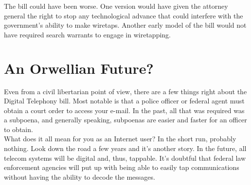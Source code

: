 The bill could have been worse. One version would have given the
attorney general the right to stop any technological advance that could
interfere with the government's ability to make wiretaps. Another early
model of the bill would not have required search warrants to engage in
wiretapping.\\

\section{An Orwellian Future?}
Even from a civil libertarian point of view, there are a few things
right about the Digital Telephony bill. Most notable is that a police
officer or federal agent must obtain a court order to access your
e-mail. In the past, all that was required was a subpoena, and
generally speaking, subpoenas are easier and faster for an officer to
obtain.\\

What does it all mean for you as an Internet user? In the short run,
probably nothing. Look down the road a few years and it's another
story. In the future, all telecom systems will be digital and, thus,
tappable. It's doubtful that federal law enforcement agencies will put
up with being able to easily tap communications without having the
ability to decode the messages.

